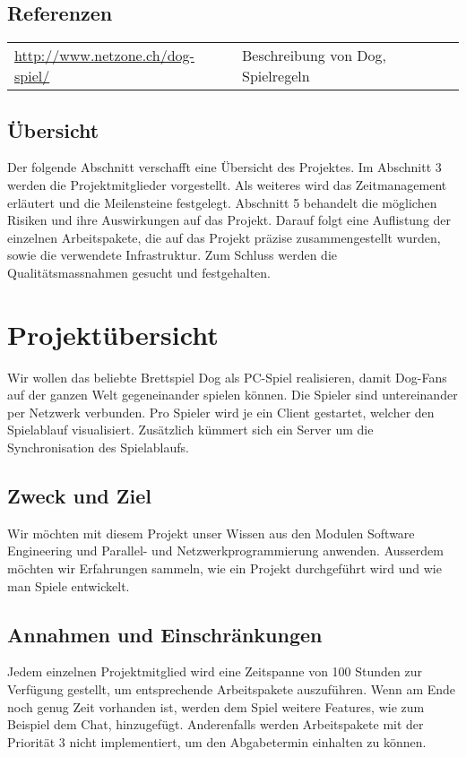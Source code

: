 \documentclass[a4paper,12pt,halfparskip,DIV14]{scrreprt}
\begin{document}
\subsection{Referenzen}

\begin{tabular}{@{}ll@{}}
\url{http://www.netzone.ch/dog-spiel/} & Beschreibung von Dog, Spielregeln
\end{tabular}

\subsection{Übersicht}

Der folgende Abschnitt verschafft eine Übersicht des Projektes. Im Abschnitt 3 werden die Projektmitglieder vorgestellt. Als weiteres wird das Zeitmanagement erläutert und die Meilensteine festgelegt. Abschnitt 5 behandelt die möglichen Risiken und ihre Auswirkungen auf das Projekt. Darauf folgt eine Auflistung der einzelnen Arbeitspakete, die auf das Projekt präzise zusammengestellt wurden, sowie die verwendete Infrastruktur. Zum Schluss werden die Qualitätsmassnahmen gesucht und festgehalten.


\section{Projektübersicht}

Wir wollen das beliebte Brettspiel Dog als PC-Spiel realisieren, damit Dog-Fans auf der ganzen Welt gegeneinander spielen können. Die Spieler sind untereinander per Netzwerk verbunden. Pro Spieler wird je ein Client gestartet, welcher den Spielablauf visualisiert. Zusätzlich kümmert sich ein Server um die Synchronisation des Spielablaufs.

\subsection{Zweck und Ziel}

Wir möchten mit diesem Projekt unser Wissen aus den Modulen Software Engineering und Parallel- und Netzwerkprogrammierung anwenden. Ausserdem möchten wir Erfahrungen sammeln, wie ein Projekt durchgeführt wird und wie man Spiele entwickelt.

\subsection{Annahmen und Einschränkungen}

Jedem einzelnen Projektmitglied wird eine Zeitspanne von 100 Stunden zur Verfügung gestellt, um entsprechende Arbeitspakete auszuführen. Wenn am Ende noch genug Zeit vorhanden ist, werden dem Spiel weitere Features, wie zum Beispiel dem Chat, hinzugefügt. Anderenfalls werden Arbeitspakete mit der Priorität 3 nicht implementiert, um den Abgabetermin einhalten zu können.
\end{document}
